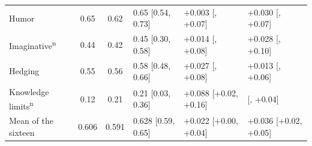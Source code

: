 {\begin{tabular}{@{}l cc l l l@{}}
Humor & 0.65 & 0.62 & 0.65 {\scriptsize[0.54, 0.73]} & +0.003 {\scriptsize[\textminus 0.06, +0.07]} & +0.030 {\scriptsize[\textminus 0.01, +0.07]} \\
Imaginative\textsuperscript{n} & 0.44 & 0.42 & 0.45 {\scriptsize[0.30, 0.58]} & +0.014 {\scriptsize[\textminus 0.06, +0.08]} & +0.028 {\scriptsize[\textminus 0.03, +0.10]} \\
Hedging & 0.55 & 0.56 & 0.58 {\scriptsize[0.48, 0.66]} & +0.027 {\scriptsize[\textminus 0.03, +0.08]} & +0.013 {\scriptsize[\textminus 0.03, +0.06]} \\
Knowledge limits\textsuperscript{n} & 0.12 & 0.21 & 0.21 {\scriptsize[0.03, 0.36]} & +0.088 {\scriptsize[+0.02, +0.16]} & \textminus 0.007 {\scriptsize[\textminus 0.05, +0.04]} \\
\midrule
Mean of the sixteen & 0.606 & 0.591 & 0.628 {\scriptsize[0.59, 0.65]} & +0.022 {\scriptsize[+0.00, +0.04]} & +0.036 {\scriptsize[+0.02, +0.05]} \\
\bottomrule
\end{tabular}}
